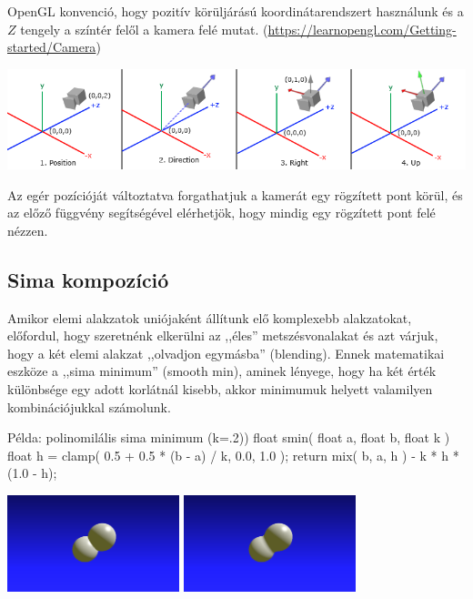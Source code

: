 OpenGL konvenció, hogy pozitív körüljárású koordinátarendszert használunk és a $Z$ tengely
a színtér felől a kamera felé mutat.
(\url{https://learnopengl.com/Getting-started/Camera})

\begin{center}
\includegraphics[width=16cm]{images/camera_axes.png}
\end{center}


Az egér pozícióját változtatva forgathatjuk a kamerát egy rögzített pont körül,
és az előző függvény segítségével elérhetjök, hogy mindig egy rögzített pont felé nézzen.


\subsection{Sima kompozíció}

Amikor elemi alakzatok uniójaként állítunk elő komplexebb alakzatokat, előfordul, hogy
szeretnénk elkerülni az ,,éles'' metszésvonalakat és azt várjuk, hogy a két elemi alakzat
,,olvadjon egymásba'' (blending). Ennek matematikai eszköze a ,,sima minimum'' (smooth min),
aminek lényege, hogy ha két érték különbsége egy adott korlátnál kisebb, akkor minimumuk helyett
valamilyen kombinációjukkal számolunk.

\begin{glsl}{Példa: polinomilális sima minimum (k=.2))}
float smin( float a, float b, float k )
{
  float h = clamp( 0.5 + 0.5 * (b - a) / k, 0.0, 1.0 );
  return mix( b, a, h ) - k * h * (1.0 - h);
}
\end{glsl}


\begin{center}
  \hfill
  \includegraphics[width=5cm]{images/uni-min.png}\hfill
  \includegraphics[width=5cm]{images/uni-smin.png}\hfill~
  \end{center}

